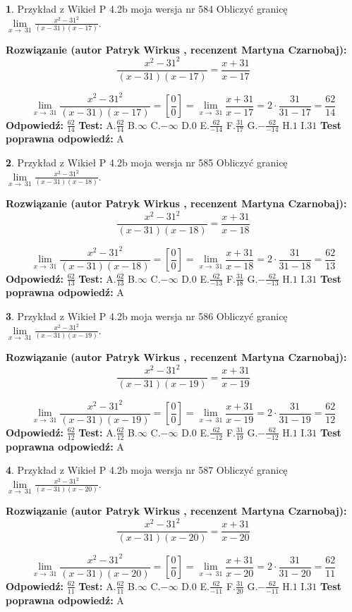 \documentclass[12pt, a4paper]{article}
\theoremstyle{definition} %
\newtheorem{zad}{}
\newcommand{\zadStart}[1]{\begin{zad}#1\newline}
\newcommand{\zadStop}{\end{zad}}
\newcommand{\rozwStart}[2]{\noindent \textbf{Rozwiązanie (autor #1 , recenzent #2): }\newline}
\newcommand{\rozwStop}{\newline}
\newcommand{\odpStart}{\noindent \textbf{Odpowiedź:}\newline}
\newcommand{\odpStop}{\newline}
\newcommand{\testStart}{\noindent \textbf{Test:}\newline}
\newcommand{\testStop}{\newline}
\newcommand{\kluczStart}{\noindent \textbf{Test poprawna odpowiedź:}\newline}
\newcommand{\kluczStop}{\newline}
\begin{document}
\zadStart{Przykład z Wikieł P 4.2b moja wersja nr 584}
Obliczyć granicę $\lim\limits_{x\to\ 31}\frac{x^{2}-31^{2}}{(x-31)(x-17)}$.
\zadStop
\rozwStart{Patryk Wirkus}{Martyna Czarnobaj}
$$\frac{x^{2}-31^{2}}{(x-31)(x-17)}=\frac{x+31}{x-17}$$

$$\lim\limits_{x\to\ 31}\frac{x^{2}-31^{2}}{(x-31)(x-17)}=[\frac{0}{0}]=\lim\limits_{x\to\ 31}\frac{x+31}{x-17}=2 \cdot \frac{31}{31-17} = \frac{62}{14}$$
\rozwStop
\odpStart
$\frac{62}{14}$
\odpStop
\testStart
A.$\frac{62}{14}$
B.$\infty$
C.$-\infty$
D.$0$
E.$\frac{62}{-14}$
F.$\frac{31}{17}$
G.$-\frac{62}{-14}$
H.$1$
I.$31$
\testStop
\kluczStart
A
\kluczStop



\zadStart{Przykład z Wikieł P 4.2b moja wersja nr 585}
Obliczyć granicę $\lim\limits_{x\to\ 31}\frac{x^{2}-31^{2}}{(x-31)(x-18)}$.
\zadStop
\rozwStart{Patryk Wirkus}{Martyna Czarnobaj}
$$\frac{x^{2}-31^{2}}{(x-31)(x-18)}=\frac{x+31}{x-18}$$

$$\lim\limits_{x\to\ 31}\frac{x^{2}-31^{2}}{(x-31)(x-18)}=[\frac{0}{0}]=\lim\limits_{x\to\ 31}\frac{x+31}{x-18}=2 \cdot \frac{31}{31-18} = \frac{62}{13}$$
\rozwStop
\odpStart
$\frac{62}{13}$
\odpStop
\testStart
A.$\frac{62}{13}$
B.$\infty$
C.$-\infty$
D.$0$
E.$\frac{62}{-13}$
F.$\frac{31}{18}$
G.$-\frac{62}{-13}$
H.$1$
I.$31$
\testStop
\kluczStart
A
\kluczStop



\zadStart{Przykład z Wikieł P 4.2b moja wersja nr 586}
Obliczyć granicę $\lim\limits_{x\to\ 31}\frac{x^{2}-31^{2}}{(x-31)(x-19)}$.
\zadStop
\rozwStart{Patryk Wirkus}{Martyna Czarnobaj}
$$\frac{x^{2}-31^{2}}{(x-31)(x-19)}=\frac{x+31}{x-19}$$

$$\lim\limits_{x\to\ 31}\frac{x^{2}-31^{2}}{(x-31)(x-19)}=[\frac{0}{0}]=\lim\limits_{x\to\ 31}\frac{x+31}{x-19}=2 \cdot \frac{31}{31-19} = \frac{62}{12}$$
\rozwStop
\odpStart
$\frac{62}{12}$
\odpStop
\testStart
A.$\frac{62}{12}$
B.$\infty$
C.$-\infty$
D.$0$
E.$\frac{62}{-12}$
F.$\frac{31}{19}$
G.$-\frac{62}{-12}$
H.$1$
I.$31$
\testStop
\kluczStart
A
\kluczStop



\zadStart{Przykład z Wikieł P 4.2b moja wersja nr 587}
Obliczyć granicę $\lim\limits_{x\to\ 31}\frac{x^{2}-31^{2}}{(x-31)(x-20)}$.
\zadStop
\rozwStart{Patryk Wirkus}{Martyna Czarnobaj}
$$\frac{x^{2}-31^{2}}{(x-31)(x-20)}=\frac{x+31}{x-20}$$

$$\lim\limits_{x\to\ 31}\frac{x^{2}-31^{2}}{(x-31)(x-20)}=[\frac{0}{0}]=\lim\limits_{x\to\ 31}\frac{x+31}{x-20}=2 \cdot \frac{31}{31-20} = \frac{62}{11}$$
\rozwStop
\odpStart
$\frac{62}{11}$
\odpStop
\testStart
A.$\frac{62}{11}$
B.$\infty$
C.$-\infty$
D.$0$
E.$\frac{62}{-11}$
F.$\frac{31}{20}$
G.$-\frac{62}{-11}$
H.$1$
I.$31$
\testStop
\kluczStart
A
\kluczStop
\end{document}

